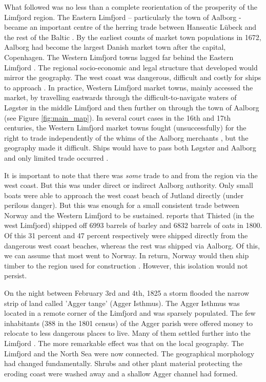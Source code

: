 \documentclass[11pt]{article}
\begin{document}
What followed was no less than a complete reorientation of the prosperity of the Limfjord region. The Eastern Limfjord – particularly the town of Aalborg - became an important centre of the herring trade between Hanseatic Lübeck and the rest of the Baltic \citep{sildeboom2022}. By the earliest counts of market town populations in 1672, Aalborg had become the largest Danish market town after the capital, Copenhagen. The Western Limfjord towns lagged far behind the Eastern Limfjord \citep{Degn1989}. The regional socio-economic and legal structure that developed would mirror the geography. The west coast was dangerous, difficult and costly for ships to approach \citep{Hald1833, p. 176}. In practice, Western Limfjord market towns, mainly accessed the market, by travelling eastwards through the difficult-to-navigate waters of Løgstør in the middle Limfjord and then further on through the town of Aalborg (see Figure \ref{fig:main_map}). In several court cases in the 16th and 17th centuries, the Western Limfjord market towns fought (unsuccessfully) for the right to trade independently of the whims of the Aalborg merchants \citep{ThistedLokalhistorie1974, p. 78-89}, but the geography made it difficult. Ships would have to pass both Løgstør and Aalborg and only limited trade occurred \citep{Poulsen2019}.

It is important to note that there was \textit{some} trade to and from the region via the west coast. But this was under direct or indirect Aalborg authority. Only small boats were able to approach the west coast beach of Jutland directly (under perilous danger). But this was enough for a small consistent trade between Norway and the Western Limfjord to be sustained. \cite[p. 30]{Aagard1802} reports that Thisted (in the west Limfjord) shipped off 6993 barrels of barley and 6832 barrels of oats in 1800. Of this 31 percent and 47 percent respectively were shipped directly from the dangerous west coast beaches, whereas the rest was shipped via Aalborg. Of this, we can assume that most went to Norway. In return, Norway would then ship timber to the region used for construction \citep[p. 234]{Christensen1735}. However, this isolation would not persist.

On the night between February 3rd and 4th, 1825 a storm flooded the narrow strip of land called 'Agger tange' (Agger Isthmus). The Agger Isthmus was located in a remote corner of the Limfjord and was sparsely populated. The few inhabitants (388 in the 1801 census) of the Agger parish were offered money to relocate to less dangerous places to live. Many of them settled further into the Limfjord \citep{Poulsen2019, Poulsen2022}. The more remarkable effect was that on the local geography. The Limfjord and the North Sea were now connected. The geographical morphology had changed fundamentally. Shrubs and other plant material protecting the eroding coast were washed away and a shallow Agger channel had formed.
\end{document}

